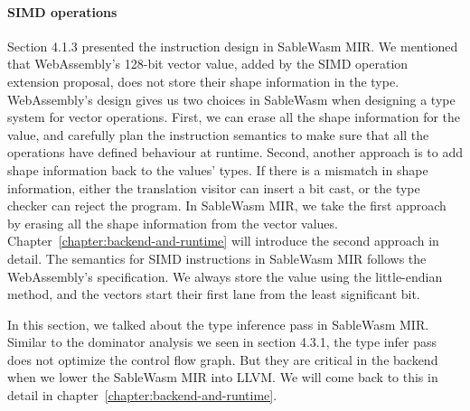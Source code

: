 \paragraph{SIMD operations}
Section 4.1.3 presented the instruction design in SableWasm MIR. We mentioned
that WebAssembly's 128-bit vector value, added by the SIMD operation extension
proposal, does not store their shape information in the type. WebAssembly's
design gives us two choices in SableWasm when designing a type system for vector
operations. First, we can erase all the shape information for the value, and
carefully plan the instruction semantics to make sure that all the operations
have defined behaviour at runtime. Second, another approach is to add shape
information back to the values' types. If there is a mismatch in shape
information, either the translation visitor can insert a bit cast, or the type
checker can reject the program. In SableWasm MIR, we take the first approach by
erasing all the shape information from the vector values.
Chapter~\ref{chapter:backend-and-runtime} will introduce the second approach in
detail. The semantics for SIMD instructions in SableWasm MIR follows the
WebAssembly's specification. We always store the value using the little-endian
method, and the vectors start their first lane from the least significant bit.

In this section, we talked about the type inference pass in SableWasm MIR.
Similar to the dominator analysis we seen in section 4.3.1, the type infer pass
does not optimize the control flow graph. But they are critical in the backend
when we lower the SableWasm MIR into LLVM. We will come back to this in detail
in chapter~\ref{chapter:backend-and-runtime}.